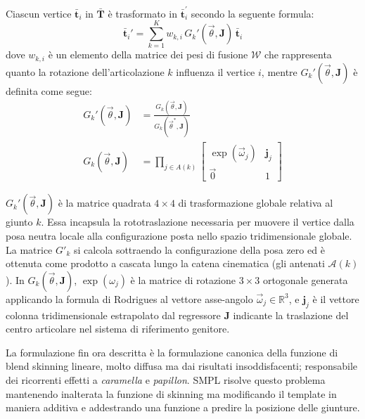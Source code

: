 Ciascun vertice $\bar{\mathbf{t}}_i$ in $\bar{\mathbf{T}}$ è trasformato in $\bar{\mathbf{t}}_i^{'}$ secondo la seguente formula:
\begin{equation}
    \bar{\mathbf{t}}_i' = \sum_{k=1}^{K} w_{k,i} \, G_k'(\vec{\theta}, \mathbf{J}) \, \bar{\mathbf{t}}_i
\end{equation}
dove $w_{k,i}$ è un elemento della matrice dei pesi di fusione $\mathcal{W}$ che rappresenta quanto la rotazione dell'articolazione $k$ influenza il vertice $i$, mentre $G_k'(\vec{\theta}, \mathbf{J})$ è definita come segue:
\begin{align}
    G_k'(\vec{\theta}, \mathbf{J}) &= \frac{G_k(\vec{\theta}, \mathbf{J})}{G_k(\vec{\theta}^{*}, \mathbf{J})} \\
    G_k(\vec{\theta}, \mathbf{J}) &= \prod_{j \in A(k)}
    \begin{bmatrix}
        \exp (\vec{\omega}_j) & \mathbf{j}_j \\
        \vec{0} & 1
    \end{bmatrix}
\end{align}

$G_k'(\vec{\theta}, \mathbf{J})$ è la matrice quadrata $4 \times 4$ di trasformazione  globale relativa al giunto $k$.
Essa incapsula la rototraslazione necessaria per muovere il vertice dalla posa neutra locale alla configurazione posta nello spazio tridimensionale globale.
La matrice $G'_k$ si calcola sottraendo la configurazione della posa zero ed è ottenuta come prodotto a cascata lungo la catena cinematica (gli antenati $\mathcal{A}(k)$).
In $G_k(\vec{\theta}, \mathbf{J})$, $\exp(\omega_j)$ è la matrice di rotazione $3 \times 3$ ortogonale generata applicando la formula di Rodrigues al vettore asse-angolo $\vec{\omega}_j \in \mathbb{R}^3$, e $\mathbf{j}_j$ è il vettore colonna tridimensionale estrapolato dal regressore $\mathbf{J}$ indicante la traslazione del centro articolare nel sistema di riferimento genitore.

\medskip
La formulazione fin ora descritta è la formulazione canonica della funzione di blend skinning lineare, molto diffusa ma dai risultati insoddisfacenti;
responsabile dei ricorrenti effetti a \emph{caramella} e \emph{papillon}.
SMPL risolve questo problema mantenendo inalterata la funzione di skinning ma modificando il template in maniera additiva e addestrando una funzione a predire la posizione delle giunture.


